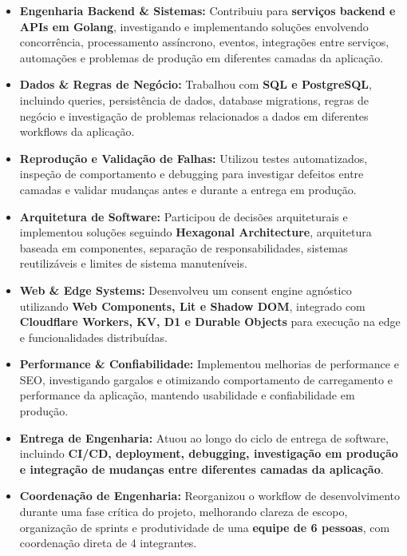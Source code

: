 \documentclass[10pt,a4paper]{article}
\begin{document}
\begin{itemize}
    \item
    \textbf{Engenharia Backend \& Sistemas:}
    Contribuiu para \textbf{serviços backend e APIs em Golang},
    investigando e implementando soluções envolvendo
    concorrência, processamento assíncrono, eventos, integrações
    entre serviços, automações e problemas de produção em
    diferentes camadas da aplicação.

    \item
    \textbf{Dados \& Regras de Negócio:}
    Trabalhou com \textbf{SQL e PostgreSQL}, incluindo queries,
    persistência de dados, database migrations, regras de negócio
    e investigação de problemas relacionados a dados em
    diferentes workflows da aplicação.

    \item
    \textbf{Reprodução e Validação de Falhas:}
    Utilizou testes automatizados, inspeção de comportamento e
    debugging para investigar defeitos entre camadas e validar
    mudanças antes e durante a entrega em produção.

    \item
    \textbf{Arquitetura de Software:}
    Participou de decisões arquiteturais e implementou soluções
    seguindo \textbf{Hexagonal Architecture}, arquitetura baseada
    em componentes, separação de responsabilidades, sistemas
    reutilizáveis e limites de sistema manuteníveis.

    \item
    \textbf{Web \& Edge Systems:}
    Desenvolveu um consent engine agnóstico utilizando
    \textbf{Web Components, Lit e Shadow DOM}, integrado com
    \textbf{Cloudflare Workers, KV, D1 e Durable Objects}
    para execução na edge e funcionalidades distribuídas.

    \item
    \textbf{Performance \& Confiabilidade:}
    Implementou melhorias de performance e SEO, investigando
    gargalos e otimizando comportamento de carregamento e
    performance da aplicação, mantendo usabilidade e
    confiabilidade em produção.

    \item
    \textbf{Entrega de Engenharia:}
    Atuou ao longo do ciclo de entrega de software, incluindo
    \textbf{CI/CD, deployment, debugging, investigação em
    produção e integração de mudanças entre diferentes camadas
    da aplicação}.

    \item
    \textbf{Coordenação de Engenharia:}
    Reorganizou o workflow de desenvolvimento durante uma fase
    crítica do projeto, melhorando clareza de escopo, organização
    de sprints e produtividade de uma \textbf{equipe de 6 pessoas},
    com coordenação direta de 4 integrantes.

\end{itemize}
\end{document}
